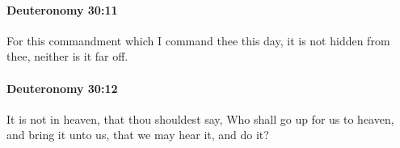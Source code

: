 		\paragraph{Deuteronomy 30:11} %
			\label{DEUTERONOMY-30-11}

			For this commandment which I command thee this day, it is not hidden from thee, neither is it far off.


		\paragraph{Deuteronomy 30:12} %
			\label{DEUTERONOMY-30-12}

			It is not in heaven, that thou shouldest say, Who shall go up for us to heaven, and bring it unto us, that we may hear it, and do it?


